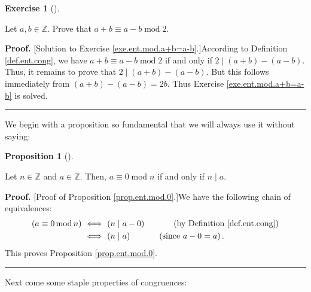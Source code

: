 \documentclass[numbers=enddot,12pt,final,onecolumn,notitlepage]{scrartcl}%
\newcounter{exer}
\numberwithin{exer}{subsection}
\theoremstyle{definition}
\newtheorem{prop}[theo]{Proposition}
\newenvironment{proposition}[1][]
{\begin{prop}[#1]\begin{leftbar}}
{\end{leftbar}\end{prop}}
\newtheorem{exmp}[exer]{Exercise}
\newenvironment{exercise}[1][]
{\begin{exmp}[#1]\begin{leftbar}}
{\end{leftbar}\end{exmp}}
\newenvironment{fineprint}{\begin{small}}{\end{small}}
\newenvironment{proof}[1][Proof]{\noindent\textbf{#1.} }{\ \rule{0.5em}{0.5em}}
\begin{document}
\begin{exercise}
\label{exe.ent.mod.a+b=a-b}Let $a,b\in\mathbb{Z}$. Prove that $a+b\equiv
a-b\operatorname{mod}2$.
\end{exercise}

\begin{fineprint}
\begin{proof}
[Solution to Exercise \ref{exe.ent.mod.a+b=a-b}.]According to Definition
\ref{def.ent.cong}, we have $a+b\equiv a-b\operatorname{mod}2$ if and only if
$2\mid\left(  a+b\right)  -\left(  a-b\right)  $. Thus, it remains to prove
that $2\mid\left(  a+b\right)  -\left(  a-b\right)  $. But this follows
immediately from $\left(  a+b\right)  -\left(  a-b\right)  =2b$. Thus Exercise
\ref{exe.ent.mod.a+b=a-b} is solved.
\end{proof}
\end{fineprint}

We begin with a proposition so fundamental that we will always use it without saying:

\begin{proposition}
\label{prop.ent.mod.0}Let $n\in\mathbb{Z}$ and $a\in\mathbb{Z}$. Then,
$a\equiv0\operatorname{mod}n$ if and only if $n\mid a$.
\end{proposition}

\begin{proof}
[Proof of Proposition \ref{prop.ent.mod.0}.]We have the following chain of
equivalences:%
\begin{align*}
\left(  a\equiv0\operatorname{mod}n\right)  \  &  \Longleftrightarrow\ \left(
n\mid a-0\right)  \ \ \ \ \ \ \ \ \ \ \left(  \text{by Definition
\ref{def.ent.cong}}\right) \\
&  \Longleftrightarrow\ \left(  n\mid a\right)  \ \ \ \ \ \ \ \ \ \ \left(
\text{since }a-0=a\right)  .
\end{align*}
This proves Proposition \ref{prop.ent.mod.0}.
\end{proof}

Next come some staple properties of congruences:
\end{document}
